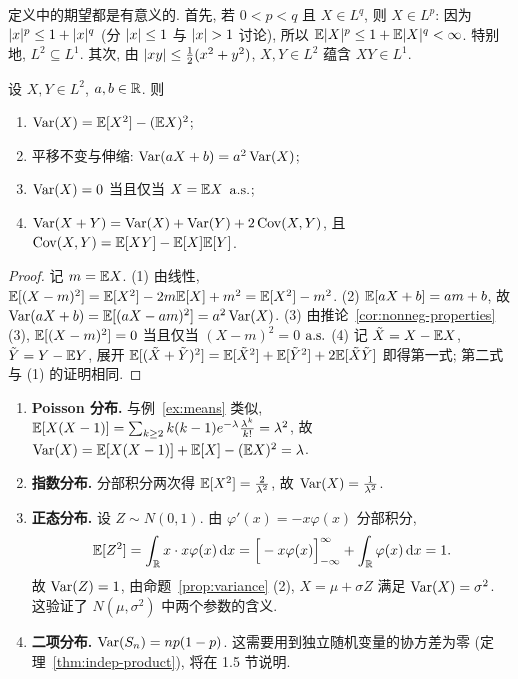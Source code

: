 定义中的期望都是有意义的. 首先, 若 $0<p<q$ 且 $X\in L^q$, 则 $X\in L^p$: 因为 $\lvert x\rvert^p\le1+\lvert x\rvert^q$ (分 $\lvert x\rvert\le1$ 与 $\lvert x\rvert>1$ 讨论), 所以 $\mathbb{E}\lvert X\rvert^p\le1+\mathbb{E}\lvert X\rvert^q<\infty$. 特别地, $L^2\subseteq L^1$. 其次, 由 $\lvert xy\rvert\le\frac{1}{2}(x^2+y^2)$, $X,Y\in L^2$ 蕴含 $XY\in L^1$.

\begin{proposition}[方差的性质]\label{prop:variance}
设 $X,Y\in L^2$, $a,b\in\mathbb{R}$. 则
\begin{enumerate}
\item $\operatorname{Var}(X)=\mathbb{E}[X^2]-(\mathbb{E} X)^2$;
\item 平移不变与伸缩: $\operatorname{Var}(aX+b)=a^2\operatorname{Var}(X)$;
\item $\operatorname{Var}(X)=0$ 当且仅当 $X=\mathbb{E} X$ $\text{a.s.}$;
\item $\operatorname{Var}(X+Y)=\operatorname{Var}(X)+\operatorname{Var}(Y)+2\operatorname{Cov}(X,Y)$, 且 $\operatorname{Cov}(X,Y)=\mathbb{E}[XY]-\mathbb{E}[X]\mathbb{E}[Y]$.
\end{enumerate}
\end{proposition}

\begin{proof}
记 $m=\mathbb{E} X$. (1) 由线性, $\mathbb{E}[(X-m)^2]=\mathbb{E}[X^2]-2m\mathbb{E}[X]+m^2=\mathbb{E}[X^2]-m^2$.
(2) $\mathbb{E}[aX+b]=am+b$, 故 $\operatorname{Var}(aX+b)=\mathbb{E}[(aX-am)^2]=a^2\operatorname{Var}(X)$.
(3) 由推论~\ref{cor:nonneg-properties} (3), $\mathbb{E}[(X-m)^2]=0$ 当且仅当 $(X-m)^2=0$ $\text{a.s.}$
(4) 记 $\tilde X=X-\mathbb{E} X$, $\tilde Y=Y-\mathbb{E} Y$, 展开 $\mathbb{E}[(\tilde X+\tilde Y)^2]=\mathbb{E}[\tilde X^2]+\mathbb{E}[\tilde Y^2]+2\mathbb{E}[\tilde X\tilde Y]$ 即得第一式; 第二式与 (1) 的证明相同.
\end{proof}

\begin{example}[常用分布的方差]\label{ex:variances}
\begin{enumerate}
\item \textbf{Poisson 分布.} 与例~\ref{ex:means} 类似, $\mathbb{E}[X(X-1)]=\sum_{k\ge2}k(k-1)e^{-\lambda}\frac{\lambda^k}{k!}=\lambda^2$, 故 $\operatorname{Var}(X)=\mathbb{E}[X(X-1)]+\mathbb{E}[X]-(\mathbb{E} X)^2=\lambda$.
\item \textbf{指数分布.} 分部积分两次得 $\mathbb{E}[X^2]=\frac{2}{\lambda^2}$, 故 $\operatorname{Var}(X)=\frac{1}{\lambda^2}$.
\item \textbf{正态分布.} 设 $Z\sim N(0,1)$. 由 $\varphi'(x)=-x\varphi(x)$ 分部积分,
\[
\mathbb{E}[Z^2]=\int_{\mathbb{R}}x\cdot x\varphi(x)\mathop{}\!\mathrm{d} x=\Big[-x\varphi(x)\Big]_{-\infty}^{\infty}+\int_{\mathbb{R}}\varphi(x)\mathop{}\!\mathrm{d} x=1.
\]
故 $\operatorname{Var}(Z)=1$, 由命题~\ref{prop:variance} (2), $X=\mu+\sigma Z$ 满足 $\operatorname{Var}(X)=\sigma^2$. 这验证了 $N(\mu,\sigma^2)$ 中两个参数的含义.
\item \textbf{二项分布.} $\operatorname{Var}(S_n)=np(1-p)$. 这需要用到独立随机变量的协方差为零 (定理~\ref{thm:indep-product}), 将在 1.5 节说明.
\end{enumerate}
\end{example}

